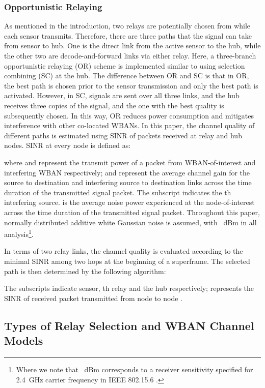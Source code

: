 \documentclass[12pt,draftcls,a4paper,onecolumn,journal]{IEEEtran}
\begin{document}
\subsubsection{Opportunistic Relaying}
As mentioned in the introduction, two relays are potentially chosen from while each sensor transmits. Therefore, there are three paths that the signal can take from sensor to hub. One is the direct link from the active sensor to the hub, while the other two are decode-and-forward links via either relay. Here, a three-branch opportunistic relaying (OR) scheme is implemented similar to using selection combining (SC) at the hub. The difference between OR and SC is that in OR, the best path is chosen prior to the sensor transmission and only the best path is activated. However, in SC, signals are sent over all three links, and the hub receives three copies of the signal, and the one with the best quality is subsequently chosen. In this way, OR reduces power consumption and mitigates interference with other co-located WBANs. In this paper, the channel quality of different paths is estimated using SINR of packets received at relay and hub nodes. SINR  at every node is defined as:


where  and  represent the transmit power of a packet from WBAN-of-interest and interfering WBAN respectively;  and  represent the average channel gain for the source to destination and interfering source to destination links across the time duration of the transmitted signal packet. The subscript  indicates the th interfering source.  is the average noise power experienced at the node-of-interest across the time duration of the transmitted signal packet. Throughout this paper, normally distributed additive white Gaussian noise is assumed, with ~dBm in all analysis\footnote{Where we note that ~dBm corresponds to a receiver sensitivity specified for 2.4~GHz carrier frequency in IEEE 802.15.6 \cite{tg6_d}.}.

In terms of two relay links, the channel quality is evaluated according to the minimal SINR among two hops at the beginning of a superframe. The selected path  is then determined by the following algorithm:



The subscripts  indicate sensor, th relay and the hub respectively;  represents the SINR of received packet transmitted from node  to node .

\subsection{Types of Relay Selection and WBAN Channel Models}
\label{sec:relset}
\end{document}
